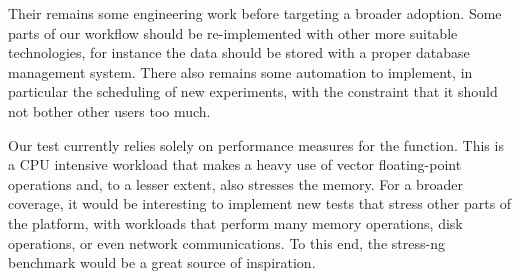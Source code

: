         Their remains some engineering work before targeting a broader adoption. Some parts of our workflow should be
        re-implemented with other more suitable technologies, for instance the data should be stored with a proper
        database management system. There also remains some automation to implement, in particular the scheduling of
        new experiments, with the constraint that it should not bother other users too much.

        Our test currently relies solely on performance measures for the \dgemm function. This is a CPU intensive
        workload that makes a heavy use of vector floating-point operations and, to a lesser extent, also stresses the
        memory. For a broader coverage, it would be interesting to implement new tests that stress other parts of the
        platform, \eg with workloads that perform many memory operations, disk operations, or even network
        communications. To this end, the stress-ng~\cite{stress-ng} benchmark would be a great source of inspiration.
